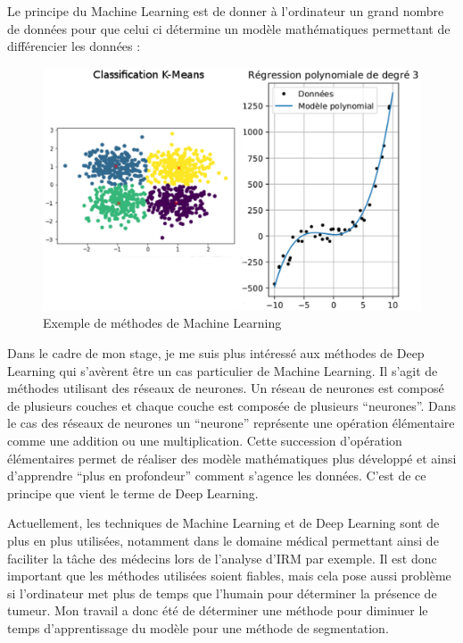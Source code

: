 \documentclass{book}
\newcommand{\p}{\vspace{0.2cm}}
\begin{document}
		Le principe du Machine Learning est de donner à l'ordinateur un grand nombre de données pour que celui ci détermine un modèle mathématiques permettant de différencier les données :
		\begin{figure}
			\begin{center}
				\includegraphics[scale = 0.5]{annex/ex_mach_lr}
				\caption{Exemple de méthodes de Machine Learning}
				\label{example}
			\end{center}
		\end{figure}\p

		Dans le cadre de mon stage, je me suis plus intéressé aux méthodes de Deep Learning qui s'avèrent être un cas particulier de Machine Learning. Il s'agit de méthodes utilisant des réseaux de neurones. Un réseau de neurones est composé de plusieurs couches et chaque couche est composée de plusieurs ``neurones''. Dans le cas des réseaux de neurones un ``neurone'' représente une opération élémentaire comme une addition ou une multiplication. Cette succession d'opération élémentaires permet de réaliser des modèle mathématiques plus développé et ainsi d'apprendre ``plus en profondeur'' comment s'agence les données. C'est de ce principe que vient le terme de Deep Learning.\p

		Actuellement, les techniques de Machine Learning et de Deep Learning sont de plus en plus utilisées, notamment dans le domaine médical permettant ainsi de faciliter la tâche des médecins lors de l'analyse d'IRM par exemple. Il est donc important que les méthodes utilisées soient fiables, mais cela pose aussi problème si l'ordinateur met plus de temps que l'humain pour déterminer la présence de tumeur. Mon travail a donc été de déterminer une méthode pour diminuer le temps d'apprentissage du modèle pour une méthode de segmentation.\p
\end{document}
